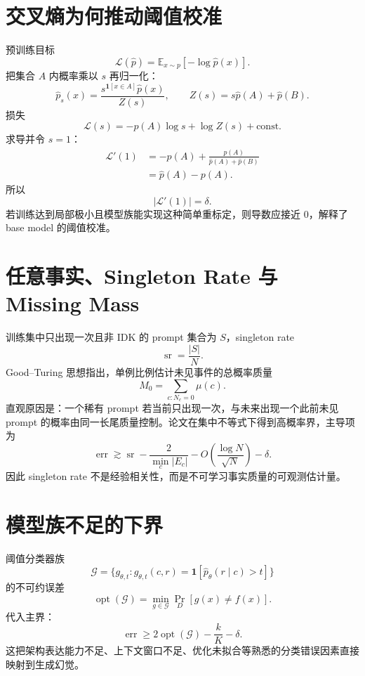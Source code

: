 \documentclass[UTF8,12pt,a4paper,fontset=none]{ctexart}
\numberwithin{equation}{section}
\newcommand{\E}{\mathbb{E}}
\newcommand{\Loss}{\mathcal{L}}
\begin{document}
\section{交叉熵为何推动阈值校准}
预训练目标
\begin{equation}
 \Loss(\widehat p)=\E_{x\sim p}[-\log\widehat p(x)].
\end{equation}
把集合 $A$ 内概率乘以 $s$ 再归一化：
\begin{equation}
 \widehat p_s(x)=\frac{s^{\mathbf1[x\in A]}\widehat p(x)}{Z(s)},
 \qquad Z(s)=s\widehat p(A)+\widehat p(B).
\end{equation}
损失
\begin{equation}
 \Loss(s)=-p(A)\log s+\log Z(s)+\text{const}.
\end{equation}
求导并令 $s=1$：
\begin{align}
 \Loss'(1)&=-p(A)+\frac{\widehat p(A)}{\widehat p(A)+\widehat p(B)}\\
 &=\widehat p(A)-p(A).
\end{align}
所以
\begin{equation}
 \boxed{|\Loss'(1)|=\delta}.
\end{equation}
若训练达到局部极小且模型族能实现这种简单重标定，则导数应接近 0，解释了 base model 的阈值校准。

\section{任意事实、Singleton Rate 与 Missing Mass}
训练集中只出现一次且非 IDK 的 prompt 集合为 $S$，singleton rate
\begin{equation}
 \operatorname{sr}=\frac{|S|}{N}.
\end{equation}
Good--Turing 思想指出，单例比例估计未见事件的总概率质量
\begin{equation}
 M_0=\sum_{c:N_c=0}\mu(c).
\end{equation}
直观原因是：一个稀有 prompt 若当前只出现一次，与未来出现一个此前未见 prompt 的概率由同一长尾质量控制。论文在集中不等式下得到高概率界，主导项为
\begin{equation}
 \operatorname{err}\gtrsim \operatorname{sr}-\frac{2}{\min_c|E_c|}-O\left(\frac{\log N}{\sqrt N}\right)-\delta.
\end{equation}
因此 singleton rate 不是经验相关性，而是不可学习事实质量的可观测估计量。

\section{模型族不足的下界}
阈值分类器族
\begin{equation}
 \mathcal G=\{g_{\theta,t}:g_{\theta,t}(c,r)=\mathbf1[\widehat p_\theta(r\mid c)>t]\}
\end{equation}
的不可约误差
\begin{equation}
 \operatorname{opt}(\mathcal G)=\min_{g\in\mathcal G}\Pr_D[g(x)\ne f(x)].
\end{equation}
代入主界：
\begin{equation}
 \operatorname{err}\ge2\operatorname{opt}(\mathcal G)-\frac{k}{K}-\delta.
\end{equation}
这把架构表达能力不足、上下文窗口不足、优化未拟合等熟悉的分类错误因素直接映射到生成幻觉。
\end{document}
